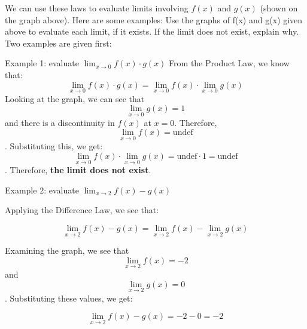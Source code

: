 We can use these laws to evaluate limits involving $f(x)$ and $g(x)$ (shown on the graph above). Here are some examples:
Use the graphs of f(x) and g(x) given above to evaluate each limit, if it exists. If the limit does not exist, explain why. Two examples are given first:

Example 1: evaluate $\lim_{x\to0} f(x) \cdot g(x)$
From the Product Law, we know that:
$$\lim_{x\to0} f(x) \cdot g(x) = \lim_{x\to0}f(x) \cdot \lim_{x\to0} g(x)$$
Looking at the graph, we can see that $$\lim_{x\to0}g(x) = 1$$ and there is a discontinuity in $f(x)$ at $x=0$. Therefore, $$\lim_{x\to0}f(x) = \text{undef}$$. Substituting this, we get: $$\lim_{x\to0}f(x) \cdot \lim_{x\to0} g(x) = \text{undef} \cdot 1 = \text{undef}$$. Therefore, \textbf{the limit does not exist}. 

Example 2: evaluate $\lim_{x\to2}f(x) - g(x)$

Applying the Difference Law, we see that:

$$\lim_{x\to2}f(x) - g(x) = \lim_{x\to2}f(x) - \lim_{x\to2}g(x)$$

Examining the graph, we see that $$\lim_{x\to2}f(x) = -2$$ and $$\lim_{x\to2}g(x) = 0$$. Substituting these values, we get:

$$\lim_{x\to2}f(x) - g(x) = -2 - 0 = -2$$

